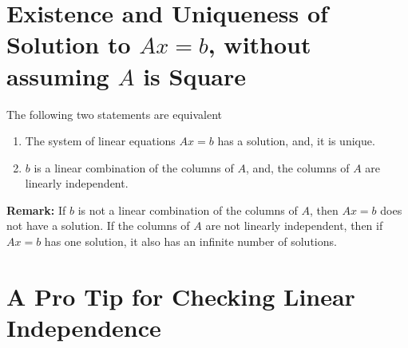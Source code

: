 \documentclass[letterpaper]{book}
\begin{document}
 \section{Existence and Uniqueness of Solution to $Ax = b$, without assuming $A$ is Square}
\begin{tcolorbox}[sharp corners, colback=green!30, colframe=green!80!blue, title=\textbf{\large Existence and Uniqueness of Solutions to $Ax=b$}]
The following two statements are equivalent
\begin{enumerate}
\renewcommand{\labelenumi}{(\alph{enumi})}
\setlength{\itemsep}{.2cm}
\item The system of linear equations $Ax=b$ has a solution, and, it is unique.

\item $b$ is a linear combination of the columns of $A$, and, the columns of $A$ are linearly independent. 
\end{enumerate}

\textbf{Remark:} If $b$ is not a linear combination of the columns of $A$, then $Ax=b$ does not have a solution. If the columns of $A$ are not linearly independent, then if $Ax=b$ has one solution, it also has an infinite number of solutions. \\


\end{tcolorbox}

\vspace*{.5cm}



\section{A Pro Tip for Checking Linear Independence}
\label{sec:proTipLinearIndependence}
\end{document}
